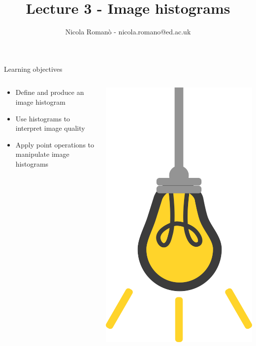 \documentclass[9pt, aspectratio=169]{beamer}
\author{Nicola Roman\`o - nicola.romano@ed.ac.uk}
\title{Lecture 3 - Image histograms}
\date{}
\begin{document}

\begin{frame}
    \titlepage
\end{frame}

\begin{frame}
    {Learning objectives}
    \begin{columns}
        \begin{column}{0.8\textwidth}
            \begin{itemize}
                \item Define and produce an image histogram
                \item Use histograms to interpret image quality
                \item Apply point operations to manipulate image histograms
            \end{itemize}
        \end{column}
        \begin{column}{0.2\textwidth}
            \includegraphics[angle=-30, origin=tr, width=1.5\textwidth]{lightbulb.png}

\end{column}
\end{columns}
\end{frame}
\end{document}
